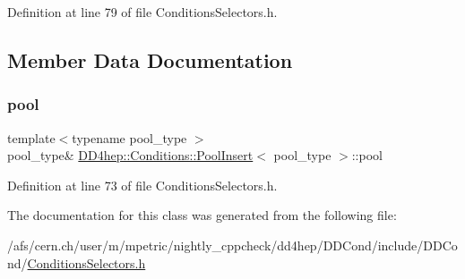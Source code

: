 Definition at line 79 of file Conditions\+Selectors.\+h.



\subsection{Member Data Documentation}
\hypertarget{class_d_d4hep_1_1_conditions_1_1_pool_insert_aba19eeaf8d2e0a226176234c454c6213}{}\label{class_d_d4hep_1_1_conditions_1_1_pool_insert_aba19eeaf8d2e0a226176234c454c6213} 
\subsubsection{\texorpdfstring{pool}{pool}}
{\footnotesize\ttfamily template$<$typename pool\+\_\+type $>$ \\
pool\+\_\+type\& \hyperlink{class_d_d4hep_1_1_conditions_1_1_pool_insert}{D\+D4hep\+::\+Conditions\+::\+Pool\+Insert}$<$ pool\+\_\+type $>$\+::pool\hspace{0.3cm}{\ttfamily [private]}}



Definition at line 73 of file Conditions\+Selectors.\+h.



The documentation for this class was generated from the following file\+:\begin{DoxyCompactItemize}
\item 
/afs/cern.\+ch/user/m/mpetric/nightly\+\_\+cppcheck/dd4hep/\+D\+D\+Cond/include/\+D\+D\+Cond/\hyperlink{_conditions_selectors_8h}{Conditions\+Selectors.\+h}\end{DoxyCompactItemize}
